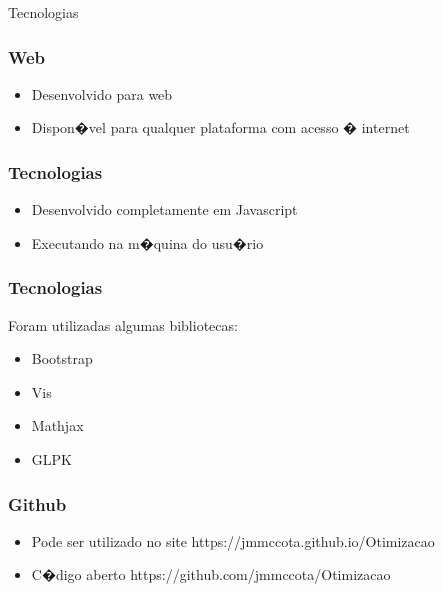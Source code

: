 \documentclass[handout]{beamer}
\begin{document}
\begin{section}{Tecnologias}

\begin{frame}\frametitle{Web}
	\begin{itemize}
		\item Desenvolvido para web
		\bigskip
		\item Dispon�vel para qualquer plataforma com acesso � internet
	\end{itemize}
\end{frame}

\begin{frame}\frametitle{Tecnologias}
	\begin{itemize}
		\item Desenvolvido completamente em Javascript
		\bigskip
		\item Executando na m�quina do usu�rio
	\end{itemize}
\end{frame}

\begin{frame}\frametitle{Tecnologias}
	Foram utilizadas algumas bibliotecas:
	\bigskip
	\begin{itemize}
		\medskip
		\item Bootstrap
		\medskip
		\item Vis
		\medskip
		\item Mathjax
		\medskip
		\item GLPK
	\end{itemize}
\end{frame}

\begin{frame}\frametitle{Github}
  \begin{itemize}
  	\item Pode ser utilizado no site https://jmmccota.github.io/Otimizacao
  	\bigskip
  	\item C�digo aberto https://github.com/jmmccota/Otimizacao
  \end{itemize}
\end{frame}

\end{section}
\end{document}
